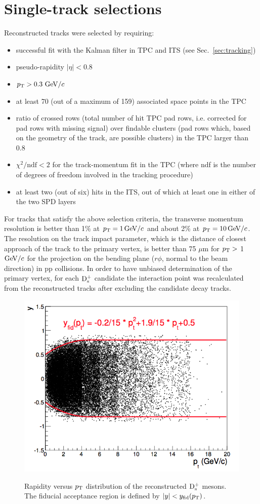 \section{Single-track selections}
\label{sec:singleTrCuts}
Reconstructed tracks were selected by requiring:
\begin{itemize}
\item successful fit with the Kalman filter in TPC and ITS (see Sec.~\ref{sec:tracking})
\item pseudo-rapidity $|\eta| < 0.8$
\item $p_{\rm T} > 0.3~\mathrm{GeV}/c$
\item at least 70 (out of a maximum of 159)
associated space points in the TPC
\item ratio of crossed rows (total number of hit TPC pad rows, i.e. corrected 
for pad rows with missing signal) over findable clusters (pad rows which, 
based on the geometry of the track, are possible clusters) in the TPC larger than 0.8
\item $\chi^2/\mathrm{ndf} < 2$ for the track-momentum fit in the TPC (where ndf is the number of degrees of 
freedom involved in the tracking procedure)
\item at least two (out of six) hits in the ITS, out of which at least one 
in either of the two SPD layers
\end{itemize}
For tracks that satisfy the above selection criteria, the transverse momentum 
resolution is better than 1$\%$ at $p_{\rm T} = 1\, \mathrm{GeV}/c$ and about 2\% at $p_{\rm T} = 10 \, \mathrm{GeV}/c$. 
The resolution on the track impact parameter, which is the distance of closest 
approach of the track to the primary vertex, is better than 75 $\mu$m for 
$p_{\rm T} >$ 1 $\mathrm{GeV}/c$ for the projection on the bending plane ($r\phi$, normal to 
the beam direction) in pp collisions.
In order to have unbiased determination of the primary vertex, for each 
${\rm D_s^+}$ candidate the interaction point was recalculated from the reconstructed 
tracks after excluding the candidate decay tracks.
\begin{figure}[!htbp]
\begin{center}
\includegraphics[width=.5\textwidth]{FigCap4/YvsPt.png}
\label{fig:singtrafter}
\caption{Rapidity versus $p_{\rm T}$ distribution of the reconstructed ${\rm D_s^+}$ mesons. The fiducial acceptance region is defined by $|y| < y_{\rm fid}(p_{\rm T})$.}
\end{center}
\end{figure}

